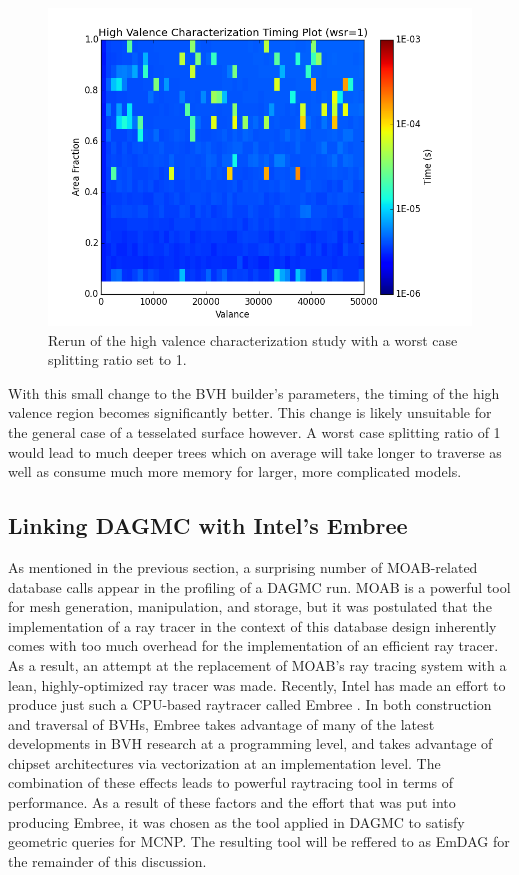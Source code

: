 \documentclass[12pt, a4paper]{article}
\begin{document}
  
\begin{figure}[H]
  \centering
    \includegraphics[scale=0.45]{hv_study_MOAB_wsr1.png}
    \caption{Rerun of the high valence characterization study with a worst case splitting ratio set to 1.}
\end{figure}


With this small change to the BVH builder's parameters, the timing of the high valence region becomes significantly better. This change is likely unsuitable for the general case of a tesselated surface however. A worst case splitting ratio of 1 would lead to much deeper trees which on average will take longer to traverse as well as consume much more memory for larger, more complicated models.

\subsection{Linking DAGMC with Intel's Embree}%
\label{emdag}

As mentioned in the previous section, a surprising number of MOAB-related database calls appear in the profiling of a DAGMC run. MOAB is a powerful tool for mesh generation, manipulation, and storage, but it was postulated that the implementation of a ray tracer in the context of this database design inherently comes with too much overhead for the implementation of an efficient ray tracer. As a result, an attempt at the replacement of MOAB's ray tracing system with a lean, highly-optimized ray tracer was made. Recently, Intel has made an effort to produce just such a CPU-based raytracer called Embree \cite{embree}. In both construction and traversal of BVHs, Embree takes advantage of many of the latest developments in BVH research at a programming level, and takes advantage of chipset architectures via vectorization at an implementation level. The combination of these effects leads to powerful raytracing tool in terms of performance. As a result of these factors and the effort that was put into producing Embree, it was chosen as the tool applied in DAGMC to satisfy geometric queries for MCNP. The resulting tool will be reffered to as EmDAG for the remainder of this discussion.
\end{document}
